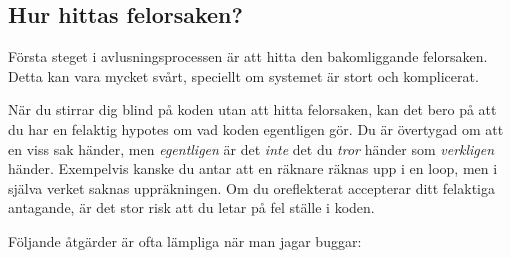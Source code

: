 \subsection{Hur hittas felorsaken?}

Första steget i avlusningsprocessen är att hitta den bakomliggande felorsaken. Detta kan vara mycket svårt, speciellt om systemet är stort och komplicerat.

När du stirrar dig blind på koden utan att hitta felorsaken, kan det bero på att du har en felaktig hypotes om vad koden egentligen gör. Du är övertygad om att en viss sak händer, men \emph{egentligen} är det \emph{inte} det du \emph{tror} händer som \emph{verkligen} händer. Exempelvis kanske du antar att en räknare räknas upp i en loop, men i själva verket saknas uppräkningen. Om du oreflekterat accepterar ditt felaktiga antagande, är det stor risk att du letar på fel ställe i koden.

Följande åtgärder är ofta lämpliga när man jagar buggar:


